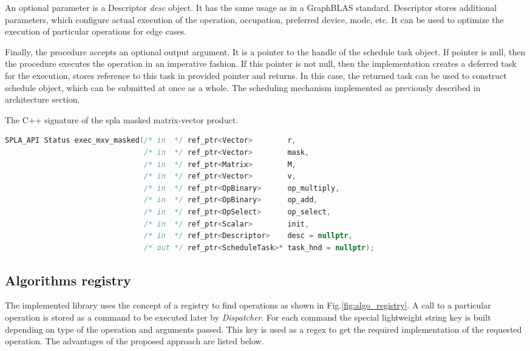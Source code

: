 An optional parameter is a Descriptor \textit{desc} object. It has the same usage as in a GraphBLAS standard. Descriptor stores additional parameters, which configure actual execution of the operation, occupation, preferred device, mode, etc. It can be used to optimize the execution of particular operations for edge cases.

Finally, the procedure accepts an optional output argument. It is a pointer to the handle of the schedule task object. If pointer is null, then the procedure executes the operation in an imperative fashion. If this pointer is not null, then the implementation creates a deferred task for the execution, stores reference to this task in provided pointer and returns. In this case, the returned task can be used to construct schedule object, which can be submitted at once as a whole. The scheduling mechanism implemented as previously described in architecture section.

\lstset{style=codelistingstyle}

\begin{algorithm}[tbp]
\caption{The C++ signature of the spla masked matrix-vector product.}
\label{alg:spla_op_example}
\begin{lstlisting}[language=C++]
SPLA_API Status exec_mxv_masked(/* in  */ ref_ptr<Vector>        r,
                                /* in  */ ref_ptr<Vector>        mask,
                                /* in  */ ref_ptr<Matrix>        M,
                                /* in  */ ref_ptr<Vector>        v,
                                /* in  */ ref_ptr<OpBinary>      op_multiply,
                                /* in  */ ref_ptr<OpBinary>      op_add,
                                /* in  */ ref_ptr<OpSelect>      op_select,
                                /* in  */ ref_ptr<Scalar>        init,
                                /* in  */ ref_ptr<Descriptor>    desc = nullptr,
                                /* out */ ref_ptr<ScheduleTask>* task_hnd = nullptr);
\end{lstlisting}
\end{algorithm}

\subsection{Algorithms registry}

The implemented library uses the concept of a registry to find operations as shown in Fig.\ref{fig:algo_registry}. A call to a particular operation is stored as a command to be executed later by \textit{Dispatcher}. For each command the special lightweight string key is built depending on type of the operation and arguments passed. This key is used as a regex to get the required implementation of the requested operation. The advantages of the proposed approach are listed below.

